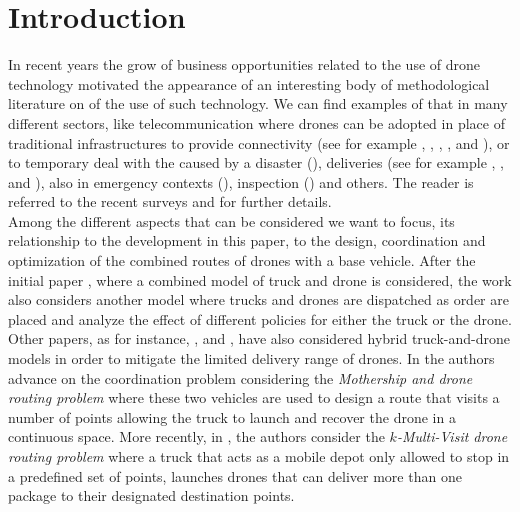 \section{Introduction}
\noindent
In recent years\RE{,} the grow of  business opportunities related to the use of drone technology  motivated the appearance of an interesting body of methodological literature on  of the use of such technology. 
We can find examples of that in many different sectors, like telecommunication where drones can be adopted in place of traditional infrastructures to provide connectivity (see\RE{,} for example \cite{art:Amorosi2018}, \cite{art:Chiaraviglio2018}, \cite{Jimenez2018}, \cite{art:Amorosi2019}, and \cite{art:Chiaraviglio2019a}), or to temporary deal with the  caused by a disaster (\cite{art:Chiaraviglio2019}), deliveries (see\RE{,} for example \cite{art:Mathew2015} , \cite{art:Ferrandez2016}, \cite{art:Poikonen2020} and \cite{art:Amorosi2020}), also in emergency contexts (\cite{art:Wen2016}), inspection (\cite{art:Trotta2018}) and others.
The reader is referred to the recent surveys \cite{art:Otto2018} and \cite{art:Chung2020} for further details.\\
\noindent
Among the different aspects that can be considered\RE{,} we want to focus,  its relationship to the development in this paper, to the design, coordination and optimization of the combined routes of drones with a base vehicle. After the initial paper \cite{MURRAY201586}, where a combined model of truck and drone is considered, the work \cite{Ulmer2018} also considers another model where trucks and drones are dispatched as  order are placed and analyze the effect of different policies for either the truck or the drone. Other papers, as\RE{,} for instance, \cite{art:Campbell2017}, \cite{art:Carlsson2017} and \cite{art:Dayarian2017}, have also considered hybrid truck-and-drone models in order to mitigate the limited delivery range of drones. In \cite{Poikonen2019} the authors advance on the coordination problem considering the \textit{Mothership and drone routing problem} where these two vehicles are used to design a route that visits a number of points allowing the truck to launch and recover the drone in a continuous space. More recently, in \cite{art:Poikonen2020}, the authors consider the \textit{$k$-Multi-Visit drone routing problem} where a truck that acts as a mobile depot only allowed to stop in a predefined set of points, launches drones that can deliver more than one package to their designated destination points. %

